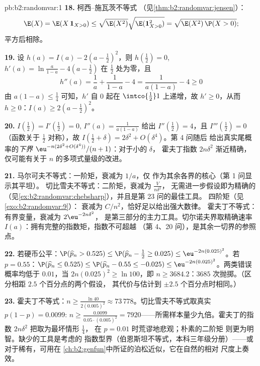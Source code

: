 \begin{solution}{pb:b2:randomvar:1}
\textbf{18.} 柯西–施瓦茨不等式
（见\cref{thm:b2:randomvar:jensen}）：
\[
\E(X) = \E(X\,\mathbf 1_{X>0})
\leq \sqrt{\E(X^2)}\sqrt{\E(\mathbf 1_{X>0}^2)}
= \sqrt{\E(X^2)\,\P(X > 0)} ;
\]
平方后相除。

\textbf{19.} 设 $h(a) = I(a) - 2(a - \tfrac12)^2$，则
$h(\tfrac12) = 0$, $h'(a) = \ln\frac a{1-a} - 4(a -
\tfrac12)$ 在 $\tfrac12$ 处为零，且
\[
h''(a) = \frac1a + \frac1{1-a} - 4 = \frac{1}{a(1-a)} - 4
\geq 0
\]
由 $a(1-a) \leq \frac14$ 可知，$h'$ 自 $0$ 起在
$\intco{\frac12}1$ 上递增，故 $h' \geq 0$，从而 $h \geq 0$：$I(a)
\geq 2(a - \tfrac12)^2$。

\textbf{20.} $I(\tfrac12) = I'(\tfrac12) = 0$, $I''(a) =
\frac1{a(1-a)}$ 给出 $I''(\tfrac12) = 4$，且 $I'''(\tfrac12)
= 0$（函数关于 $\tfrac12$ 对称），故
$I(\tfrac12 + \delta) = 2\delta^2 + O(\delta^4)$。第 4 问随后
给出真实尾概率的\emph{下界}
$\eu^{-n(2\delta^2 + O(\delta^4))}/(n+1)$：对于小的 $\delta$，
霍夫丁指数 $2n\delta^2$ 渐近精确，
仅可能有关于 $n$ 的多项式量级的改进。

\textbf{21.} 马尔可夫不等式：一阶矩，衰减为 $1/a$，仅
作为其余各界的核心（第 1 问显示其平坦）。
切比雪夫不等式：二阶矩，衰减为 $\frac{V}{n\delta^2}$，
无需进一步假设即为精确的
（见\cref{ex:b2:randomvar:chebsharp}），并且是第 23 问的最佳工具。
四阶矩（见\cref{exo:b2:randomvar:9}）：
衰减为 $C/n^2$，恰好足以给出强大数律。
霍夫丁不等式：有界变量，衰减为 $2\eu^{-2n\delta^2}$，
是第三部分的主力工具。切尔诺夫界取精确速率
$I(a)$：拥有完整的指数矩，指数不可超越
（第 4、20 问），是其余一切界的参照点。

\textbf{22.} 若硬币公平：$\P(\widehat p_n > 0.525)
\leq \P(\widehat p_n - \tfrac12 \geq 0.025) \leq
\eu^{-2n(0.025)^2}$。若 $p = 0.55$：$\P(\widehat p_n \leq
0.525) \leq \P(\widehat p_n - 0.55 \leq -0.025) \leq
\eu^{-2n(0.025)^2}$。两类错误概率均低于 $0.01$，当
$2n(0.025)^2 \geq \ln 100$，即 $n \geq 3684.2$：$3685$
次抛掷。（区分相距 $2.5$ 个百分点的两个假设，
其代价与估计到 $\pm2.5$ 个百分点时相同。）

\textbf{23.} 霍夫丁不等式：$n \geq \frac{\ln 40}{2(0.005)^2}
\approx 73\,778$。切比雪夫不等式取真实 $p(1-p)
= 0.0099$: $n \geq \frac{0.0099}{0.05\cdot(0.005)^2} =
7920$——所需样本量少九倍。霍夫丁的指数
$2n\delta^2$ 把取为最坏情形 $\frac14$，
在 $p = 0.01$ 时荒谬地悲观；朴素的二阶矩
则更为明智。缺少的工具是考虑的
指数型界（伯恩斯坦不等式，本科三年级分册）——或
对于稀有，可用在
\cref{ch:b2:genfun}中所证的泊松近似，它在自然的相对
尺度上奏效。


\end{solution}
